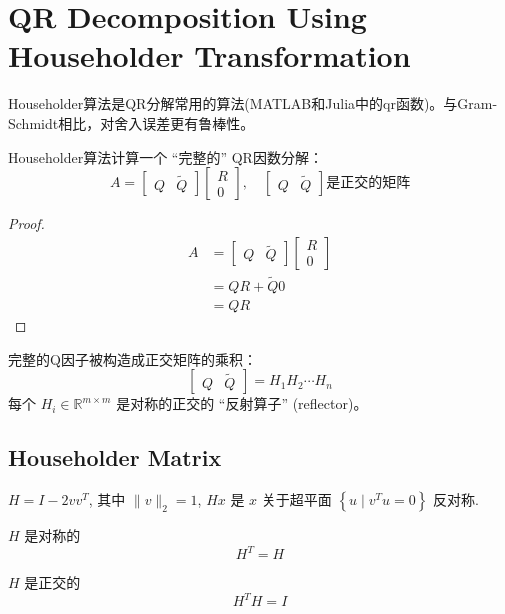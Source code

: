 \section{QR Decomposition Using Householder Transformation}

Householder算法是QR分解常用的算法(MATLAB和Julia中的qr函数)。与Gram-Schmidt相比，对舍入误差更有鲁棒性。

Householder算法计算一个 “完整的” QR因数分解：
$$ A=\left[\begin{array}{ll}Q & \tilde{Q}\end{array}\right]\left[\begin{array}{l}R \\ 0\end{array}\right], \quad\left[\begin{array}{ll}Q & \tilde{Q}\end{array}\right]  是正交的矩阵$$

\begin{proof}
    $$
    \begin{aligned}
        A&=\left[\begin{array}{ll}Q & \tilde{Q}\end{array}\right]\left[\begin{array}{l}R \\ 0\end{array}\right]\\
        &=QR + \tilde{Q} 0 \\ 
        & = QR
    \end{aligned}
    $$
\end{proof}

完整的Q因子被构造成正交矩阵的乘积：
$$
\left[\begin{array}{ll}
Q & \tilde{Q}
\end{array}\right]=H_{1} H_{2} \cdots H_{n}
$$
每个 $ H_{i} \in \mathbb{R}^{m \times m} $ 是对称的正交的 “反射算子” (reflector)。


\subsection{Householder Matrix}

\begin{theorem}
    $ H=I-2 v v^{T} $, 其中 $ \|v\|_{2}=1 $, $ H x $ 是 $ x $ 关于超平面 $ \left\{u \mid v^{T} u=0\right\} $ 反对称.

    $ H $ 是对称的 
    $$ H^{T}=H $$

$ H $ 是正交的 
$$ H^{T} H=I $$
\end{theorem}
    

